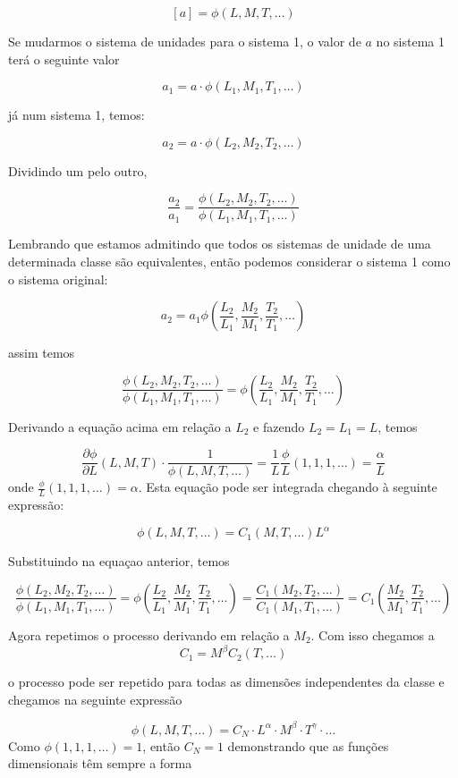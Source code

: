 \[
[a] = \phi\left( L, M, T, \ldots\right)
\]

Se mudarmos o sistema de unidades para o sistema 1, o valor de $a$ no sistema 1 terá o seguinte valor

\[
a_1 = a\cdot\phi\left(L_1, M_1, T_1, \ldots\right)
\]

já num sistema 1, temos:

\[
a_2 = a\cdot\phi\left(L_2, M_2, T_2, \ldots\right)
\]

Dividindo um pelo outro,

\[
\frac{a_2}{a_1} = \frac{ \phi\left(L_2, M_2, T_2, \ldots\right) }{ \phi\left(L_1, M_1, T_1, \ldots\right) }
\]

Lembrando que estamos admitindo que todos os sistemas de unidade de uma determinada classe são equivalentes, então podemos considerar o sistema 1 como o sistema original:

\[
a_2 = a_1\phi\left(\frac{L_2}{L_1}, \frac{M_2}{M_1}, \frac{T_2}{T_1}, \ldots \right)
\]

assim temos


\[
\frac{ \phi\left(L_2, M_2, T_2, \ldots\right) }{ \phi\left(L_1, M_1, T_1, \ldots\right) } = \phi\left(\frac{L_2}{L_1}, \frac{M_2}{M_1}, \frac{T_2}{T_1}, \ldots \right)
\]

Derivando a equação acima em relação a $L_2$ e fazendo $L_2 = L_1 = L$, temos

\[
\frac{\partial\phi}{\partial L}(L,M,T) \cdot \frac{1}{\phi(L,M,T,\ldots)} = \frac{1}{L}\frac{\phi}{L}(1,1,1,\ldots) = \frac{\alpha}{L}
\]
onde $\frac{\phi}{L}(1,1,1,\ldots) = \alpha$. Esta equação pode ser integrada chegando à seguinte expressão:

\[
\phi(L,M,T,\ldots) = C_1(M,T,\ldots) L^\alpha
\]

Substituindo na equaçao anterior, temos

\[
\frac{ \phi\left(L_2, M_2, T_2, \ldots\right) }{ \phi\left(L_1, M_1, T_1, \ldots\right) } = \phi\left(\frac{L_2}{L_1}, \frac{M_2}{M_1}, \frac{T_2}{T_1}, \ldots \right) =
\frac{ C_1\left(M_2, T_2, \ldots\right) }{ C_1\left(M_1, T_1, \ldots\right) } = C_1\left(\frac{M_2}{M_1}, \frac{T_2}{T_1}, \ldots \right)
\]

Agora repetimos o processo derivando em relação a $M_2$. Com isso chegamos a
\[
C_1 = M^\beta C_2(T, \ldots)
\]

o processo pode ser repetido para todas as dimensões independentes da classe e chegamos na seguinte expressão

\[
\phi(L,M,T,\ldots) = C_N\cdot L^\alpha\cdot M^\beta \cdot T^\gamma\cdot\ldots
\]
Como $\phi(1,1,1,\ldots) = 1$, então $C_N = 1$ demonstrando que as funções dimensionais têm sempre a forma

